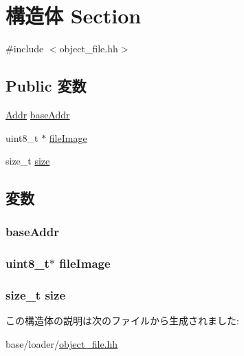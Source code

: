 \hypertarget{structObjectFile_1_1Section}{
\section{構造体 Section}
\label{structObjectFile_1_1Section}
}


{\ttfamily \#include $<$object\_\-file.hh$>$}\subsection*{Public 変数}
\begin{DoxyCompactItemize}
\item 
\hyperlink{base_2types_8hh_af1bb03d6a4ee096394a6749f0a169232}{Addr} \hyperlink{structObjectFile_1_1Section_ab8b2ea9ac4bd680f931257c07f96a8a7}{baseAddr}
\item 
uint8\_\-t $\ast$ \hyperlink{structObjectFile_1_1Section_a00b348b061f5075686180cf11654b898}{fileImage}
\item 
size\_\-t \hyperlink{structObjectFile_1_1Section_a854352f53b148adc24983a58a1866d66}{size}
\end{DoxyCompactItemize}


\subsection{変数}
\hypertarget{structObjectFile_1_1Section_ab8b2ea9ac4bd680f931257c07f96a8a7}{
\subsubsection[{baseAddr}]{ {\bf baseAddr}}}
\label{structObjectFile_1_1Section_ab8b2ea9ac4bd680f931257c07f96a8a7}
\hypertarget{structObjectFile_1_1Section_a00b348b061f5075686180cf11654b898}{
\subsubsection[{fileImage}]{\setlength{\rightskip}{0pt plus 5cm}uint8\_\-t$\ast$ {\bf fileImage}}}
\label{structObjectFile_1_1Section_a00b348b061f5075686180cf11654b898}
\hypertarget{structObjectFile_1_1Section_a854352f53b148adc24983a58a1866d66}{
\subsubsection[{size}]{\setlength{\rightskip}{0pt plus 5cm}size\_\-t {\bf size}}}
\label{structObjectFile_1_1Section_a854352f53b148adc24983a58a1866d66}


この構造体の説明は次のファイルから生成されました:\begin{DoxyCompactItemize}
\item 
base/loader/\hyperlink{object__file_8hh}{object\_\-file.hh}\end{DoxyCompactItemize}
